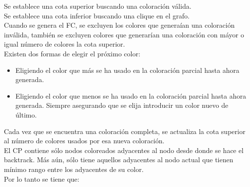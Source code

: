 \documentclass[a4paper,10pt]{article}
\begin{document}
\indent Se establece una cota superior buscando una coloraci\'on
v\'alida.\\
\indent Se establece una cota inferior buscando una clique en el grafo.\\
\indent Cuando se genera el FC, se excluyen los colores que genera\'ian
una coloraci\'on inv\'alida, tambi\'en se excluyen colores que
generar\'ian una coloraci\'on con m\'ayor o igual n\'umero de colores
la cota superior.\\
\indent Existen dos formas de elegir el pr\'oximo color:
\begin{itemize}
 \item Eligiendo el color que m\'as se ha usado en la coloraci\'on
       parcial hasta ahora generada.
 \item Eligiendo el color que menos se ha usado en la coloraci\'on
       parcial hasta ahora generada. Siempre asegurando que se elija
       introducir un color nuevo de \'ultimo.
\end{itemize}
\indent Cada vez que se encuentra una coloraci\'on completa, se
actualiza la cota superior al n\'umero de colores usados por esa nueva
coloraci\'on.\\
\indent El CP contiene s\'olo nodos coloreados adyacentes al nodo desde
donde se hace el backtrack. M\'as a\'un, s\'olo tiene aquellos
adyacentes al nodo actual que tienen m\'inimo rango entre los adyacentes
de su color.\\
Por lo tanto se tiene que:
\end{document}
